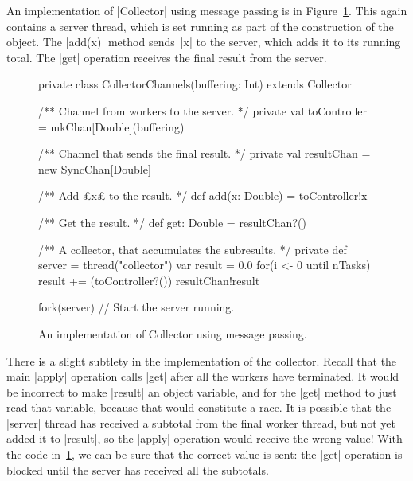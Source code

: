 
An implementation of |Collector| using message passing is in
Figure~\ref{fig:collector}.  This again contains a server thread, which is set
running as part of the construction of the object.  The |add(x)| method
sends~|x| to the server, which adds it to its running total.  The |get|
operation receives the final result from the server.


\begin{figure}
\begin{scala}
  private class CollectorChannels(buffering: Int) extends Collector{
    /** Channel from workers to the server. */
    private val toController = mkChan[Double](buffering)

    /** Channel that sends the final result. */
    private val resultChan = new SyncChan[Double]

    /** Add £x£ to the result. */
    def add(x: Double) = toController!x

    /** Get the result. */
    def get: Double = resultChan?()
    
    /** A collector, that accumulates the subresults. */
    private def server = thread("collector"){
      var result = 0.0
      for(i <- 0 until nTasks) result += (toController?())
      resultChan!result
    }

    fork(server)    // Start the server running.
  }
\end{scala}
\caption{An implementation of {\scalastyle Collector} using message passing.}
\label{fig:collector}
\end{figure}



There is a slight subtlety in the implementation of the collector.  Recall
that the main |apply| operation calls |get| after all the workers have
terminated.  It would be incorrect to make |result| an object variable, and
for the |get| method to just read that variable, because that would constitute
a race.  It is possible that the |server| thread has received a subtotal
from the final worker thread, but not yet added it to |result|, so the |apply|
operation would receive the wrong value!  With the code
in~\ref{fig:collector}, we can be sure that the correct value is sent: the
|get| operation is blocked until the server has received all the subtotals.

